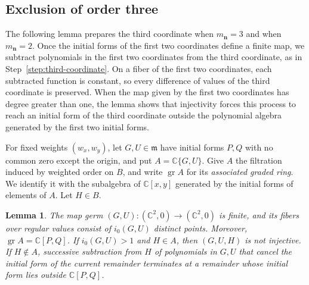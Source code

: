 \documentclass[11pt,letterpaper]{article}
\numberwithin{equation}{section}
\newtheorem{lemma}[lemma]{Lemma}
\theoremstyle{remark}
\theoremstyle{plain}
\newcommand{\C}{\mathbb{C}}
\begin{document}
\subsection{Exclusion of order three}

The following lemma prepares the third coordinate when
$m_{\boldsymbol n}=3$ and when $m_{\boldsymbol n}=2$.
Once the initial forms of the first two coordinates define a finite map,
we subtract polynomials
in the first two coordinates from the third coordinate, as in
Step~\ref{step:third-coordinate}.  On a fiber of the first two
coordinates, each subtracted function is constant, so every difference
of values of the third coordinate is preserved.  When the map given by
the first two coordinates has degree greater than one, the lemma shows
that injectivity forces this process to reach an initial form of the third
coordinate outside the polynomial algebra generated by the first two
initial forms.

For fixed weights $(w_x,w_y)$, let $G,U\in\mathfrak m$ have initial
forms $P,Q$ with no common zero except the origin, and put $A=\C\{G,U\}$.
Give $A$ the filtration induced by weighted order on $B$, and
write $\operatorname{gr}A$ for its \emph{associated graded ring}.
We identify it with the subalgebra of $\C[x,y]$ generated by the
initial forms of elements of $A$.
Let $H\in B$.

\begin{lemma}
\label{lem:finite-plane-degree}
\label{lem:filtered-escape}
The map germ $(G,U):(\C^2,0)\to(\C^2,0)$ is finite, and its fibers
over regular values consist of $i_0(G,U)$ distinct points.  Moreover,
$\operatorname{gr}A=\C[P,Q]$.
If $i_0(G,U)>1$ and $H\in A$, then $(G,U,H)$ is not
injective.  If $H\notin A$, successive subtraction from $H$ of polynomials
in $G,U$ that cancel the initial form of the current remainder terminates at a
remainder whose initial form lies outside $\C[P,Q]$.
\end{lemma}
\end{document}
